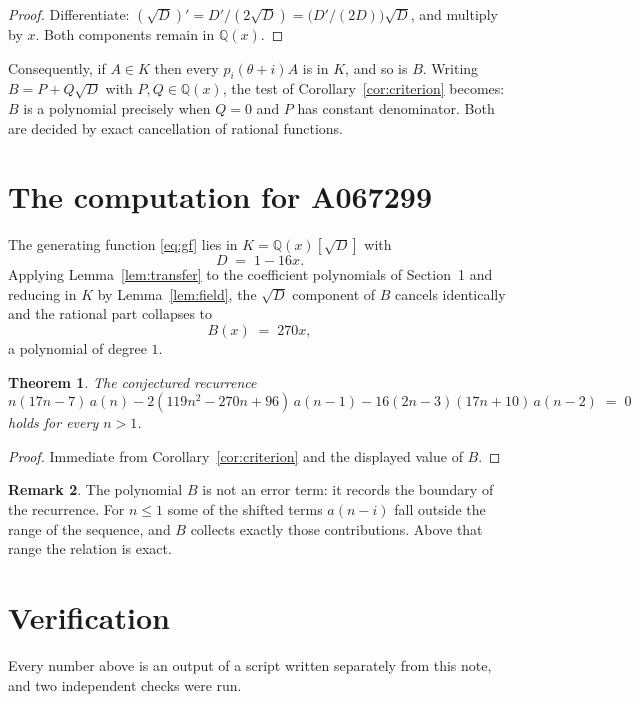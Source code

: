 \documentclass[11pt,a4paper]{article}
\theoremstyle{plain}
\newtheorem{theorem}{Theorem}
\theoremstyle{definition}
\newtheorem{remark}[theorem]{Remark}
\begin{document}
\begin{proof}
Differentiate: $(\sqrt{D})'=D'/(2\sqrt{D})=\bigl(D'/(2D)\bigr)\sqrt{D}$, and multiply by
$x$. Both components remain in $\mathbb{Q}(x)$.
\end{proof}

Consequently, if $A\in K$ then every $p_{i}(\theta+i)A$ is in $K$, and so is $B$. Writing
$B=P+Q\sqrt{D}$ with $P,Q\in\mathbb{Q}(x)$, the test of Corollary~\ref{cor:criterion}
becomes: $B$ is a polynomial precisely when $Q=0$ and $P$ has constant denominator. Both
are decided by exact cancellation of rational functions.

\section{The computation for A067299}

The generating function \eqref{eq:gf} lies in $K=\mathbb{Q}(x)[\sqrt{D}]$ with
\[
D \;=\; 1 - 16 x .
\]
Applying Lemma~\ref{lem:transfer} to the coefficient polynomials of Section~1 and reducing
in $K$ by Lemma~\ref{lem:field}, the $\sqrt{D}$ component of $B$ cancels identically and
the rational part collapses to
\[
B(x)\;=\;270 x ,
\]
a polynomial of degree $1$.

\begin{theorem}
The conjectured recurrence
\[
n \left(17 n - 7\right)\,a(n) -  2 \left(119 n^{2} - 270 n + 96\right)\,a(n-1) -  16 \left(2 n - 3\right) \left(17 n + 10\right)\,a(n-2) \;=\;0
\]
holds for every $n>1$.
\end{theorem}

\begin{proof}
Immediate from Corollary~\ref{cor:criterion} and the displayed value of $B$.
\end{proof}

\begin{remark}
The polynomial $B$ is not an error term: it records the boundary of the recurrence. For
$n\le1$ some of the shifted terms $a(n-i)$ fall outside the range of the sequence,
and $B$ collects exactly those contributions. Above that range the relation is exact.
\end{remark}

\section{Verification}

Every number above is an output of a script written separately from this note, and two
independent checks were run.
\end{document}
